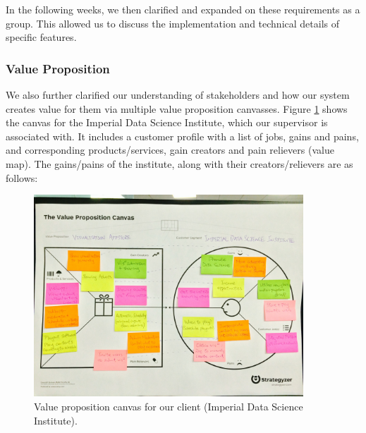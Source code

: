 \documentclass[a4paper, titlepage]{article}
\begin{document}
In the following weeks, we then clarified and expanded on these requirements as a group. This allowed us to discuss the implementation and technical details of specific features.

\subsubsection{Value Proposition}

We also further clarified our understanding of stakeholders and how our system creates value for them via multiple value proposition canvasses. Figure \ref{fig:eval_valpropcanvas} shows the canvas for the Imperial Data Science Institute, which our supervisor is associated with. It includes a customer profile with a list of jobs, gains and pains, and corresponding products/services, gain creators and pain relievers (value map). The gains/pains of the institute, along with their creators/relievers are as follows:

\begin{figure}[h!]
   \begin{center}
      \includegraphics[width = 0.9\textwidth, trim = 1cm 6.5cm 1cm 4.5cm, clip]{./eval/value_prop_canvas.jpg}
   \end{center}
   \caption{Value proposition canvas for our client (Imperial Data Science Institute).}
   \label{fig:eval_valpropcanvas}
\end{figure}
\end{document}
